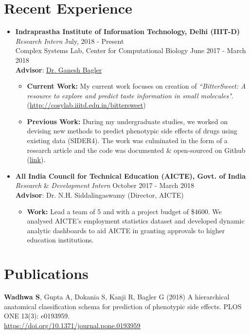 \documentclass[margin,line]{res}
\begin{document}
\begin{resume}
\section{\sc Recent Experience}
\begin{itemize}[leftmargin=*]
\item {\bf Indraprastha Institute of Information Technology, Delhi (IIIT-D)}\\
\textit{Research Intern} \hfill July, 2018 - Present\\
Complex Systems Lab, Center for Computational Biology \hfill June 2017 - March 2018 \\  
{\bf Advisor}: {\href{https://scholar.google.co.in/citations?user=qyth_0QAAAAJ&hl=en}{\underline{Dr. Ganesh Bagler}}}
\begin{itemize}[leftmargin=*]
\item {\bf Current Work:} My current work focuses on creation of \textit{``BitterSweet: A resource to explore and predict taste information in small molecules"}. ({\href{http://cosylab.iiitd.edu.in/bittersweet/}{http://cosylab.iiitd.edu.in/bittersweet}})
\item {\bf Previous Work:} During my undergraduate studies, we worked on devising new methods to predict phenotypic side effects of drugs using existing data (SIDER4). The work was culminated in the form of a research article and the code was documented \& open-sourced on Github ({\href{https://github.com/sominwadhwa/drugADR}{\underline{link}}}).
\end{itemize}
\item {\bf All India Council for Technical Education (AICTE), Govt. of India}\\
\textit{Research} \& \textit{Development Intern} \hfill October 2017 - March 2018\\  
{\bf Advisor}: Dr. N.H. Siddalingaswamy (Director, AICTE)
\begin{itemize}[leftmargin=*]
\item {\bf Work:} Lead a team of 5 and with a project budget of \$4600. We analysed AICTE's employment statistics dataset and developed dynamic analytic dashboards to aid AICTE in granting approvals to higher education institutions.
\end{itemize}
\end{itemize}

\section{\sc Publications}
{\bf Wadhwa S}, Gupta A, Dokania S, Kanji R, Bagler G (2018) A hierarchical anatomical classification schema for prediction of phenotypic side effects. PLOS ONE 13(3): e0193959. 
\\{\href{https://doi.org/10.1371/journal.pone.0193959}{\underline{https://doi.org/10.1371/journal.pone.0193959}}}


\end{resume}
\end{document}
